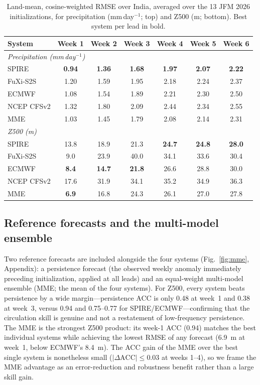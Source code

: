 \documentclass[11pt]{article}
\begin{document}
\begin{table}[t]
  \centering
  \small
  \caption{Land-mean, cosine-weighted RMSE over India, averaged over the
  13 JFM 2026 initializations, for precipitation (mm\,day$^{-1}$; top)
  and Z500 (m; bottom). Best system per lead in bold.}
  \label{tab:rmse}
  \setlength{\tabcolsep}{5pt}
  \begin{tabular}{lcccccc}
    \toprule
    System & Week 1 & Week 2 & Week 3 & Week 4 & Week 5 & Week 6 \\
    \midrule
    \multicolumn{7}{l}{\emph{Precipitation (mm\,day$^{-1}$)}}\\
    SPIRE        & \textbf{0.94} & \textbf{1.36} & \textbf{1.68} & \textbf{1.97} & \textbf{2.07} & \textbf{2.22} \\
    FuXi-S2S     & 1.20 & 1.59 & 1.95 & 2.18 & 2.24 & 2.37 \\
    ECMWF        & 1.08 & 1.54 & 1.89 & 2.21 & 2.30 & 2.50 \\
    NCEP CFSv2   & 1.32 & 1.80 & 2.09 & 2.44 & 2.34 & 2.55 \\
    MME          & 1.03 & 1.45 & 1.79 & 2.08 & 2.14 & 2.31 \\
    \midrule
    \multicolumn{7}{l}{\emph{Z500 (m)}}\\
    SPIRE        & 13.8 & 18.9 & 21.3 & \textbf{24.7} & \textbf{24.8} & \textbf{28.0} \\
    FuXi-S2S     &  9.0 & 23.9 & 40.0 & 34.1          & 33.6          & 30.4 \\
    ECMWF        & \textbf{8.4} & \textbf{14.7} & \textbf{21.8} & 26.6 & 28.8 & 30.0 \\
    NCEP CFSv2   & 17.6 & 31.9 & 34.1 & 35.2          & 34.9          & 36.3 \\
    MME          & \textbf{6.9} & 16.8 & 24.3 & 26.1 & 27.0 & 27.8 \\
    \bottomrule
  \end{tabular}
\end{table}

\subsection{Reference forecasts and the multi-model ensemble}
\label{sec:mme}

Two reference forecasts are included alongside the four systems
(Fig.~\ref{fig:mme}, Appendix): a persistence forecast (the observed
weekly anomaly immediately preceding initialization, applied at all
leads) and an equal-weight multi-model ensemble (MME; the mean of the
four systems). For Z500, every system beats persistence by a wide
margin---persistence ACC is only 0.48 at week~1 and 0.38 at week~3,
versus 0.94 and 0.75--0.77 for SPIRE/ECMWF---confirming that the
circulation skill is genuine and not a restatement of low-frequency
persistence. The MME is the strongest
Z500 product: its week-1 ACC (0.94) matches the best individual systems
while achieving the lowest RMSE of any forecast (6.9~m at week~1, below
ECMWF's 8.4~m). The ACC gain of the MME over the best single system
is nonetheless small ($|\Delta\mathrm{ACC}|\leq0.03$ at weeks 1--4), so
we frame the MME advantage as an error-reduction and robustness benefit
rather than a large skill gain.
\end{document}
